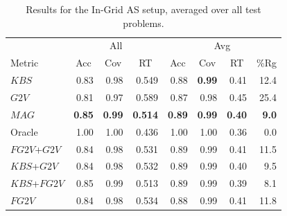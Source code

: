 \documentclass{ecai}
\newcommand{\Carmel}[1]{\textcolor{red}{\textsc{Carmel}: #1}}
\newcommand{\Roni}[1]{}
\newcommand{\gtv}[1]{\ensuremath{\textit{G2V}}\xspace}
\newcommand{\fgtv}[1]{\ensuremath{\textit{FG2V}}\xspace}
\newcommand{\kaduri}[1]{\ensuremath{\textit{KBS}}\xspace}
\newcommand{\mapfgas}[1]{\ensuremath{\textit{MAG}}\xspace}
\begin{document}
\begin{table}
\begin{tabular}{@{}lrrr|rrrr@{}}
\toprule
         & \multicolumn{3}{c}{All}                                                    & \multicolumn{4}{c}{Avg}                                                                                \\ 
Metric   & \multicolumn{1}{c}{Acc} & \multicolumn{1}{c}{Cov} & \multicolumn{1}{c|}{RT} & \multicolumn{1}{c}{Acc} & \multicolumn{1}{c}{Cov} & \multicolumn{1}{c}{RT} & \multicolumn{1}{c}{\%Rg} \\ \midrule
\kaduri{}      & 0.83                    & 0.98                    & 0.549                  & 0.88                    & \textbf{0.99}           & 0.41                   & 12.4                      \\
\gtv{}      & 0.81                    & 0.97                    & 0.589                 & 0.87                    & 0.98                    & 0.45                   & 25.4                      \\
\mapfgas\   & \textbf{0.85}           & \textbf{0.99}           & \textbf{0.514}         & \textbf{0.89}           & \textbf{0.99}           & \textbf{0.40}          & \textbf{9.0} \\ \midrule
Oracle   & 1.00                    & 1.00                    & 0.436                  & 1.00                    & 1.00                    & 0.36                   & 0.0                       \\\midrule
\fgtv{}+\gtv{} & 0.84                    & 0.98                    & 0.531                  & 0.89                    & 0.99                    & 0.41                   & 11.5                      \\
\kaduri{}+\gtv{}  & 0.84                    & 0.98                    & 0.532                  & 0.89                    & 0.99                    & 0.40                   & 9.5                       \\
\kaduri{}+\fgtv{} & 0.85                    & 0.99                    & 0.513                  & 0.89                    & 0.99                    & 0.39                   & 8.1                       \\
\fgtv{}     & 0.84                    & 0.98                    & 0.534                  & 0.88                    & 0.99                    & 0.41                   & 11.8                      \\ \bottomrule
\end{tabular}
\caption{Results for the In-Grid AS setup, averaged over all test problems.} 
\label{tab:in-grid-all}
\end{table}
\end{document}
